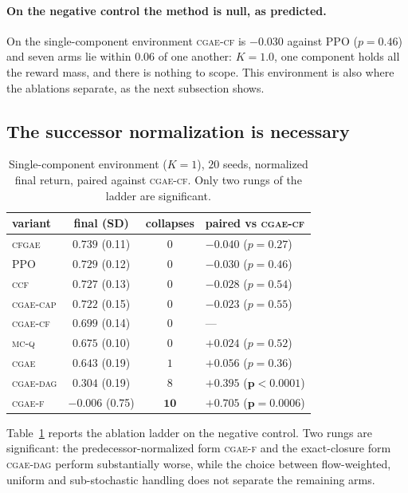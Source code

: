 \documentclass[review,authoryear,3p,times]{elsarticle}
\newcommand{\cgae}{\textsc{cgae}}              %
\newcommand{\cflow}{\textsc{cgae-cf}}          %
\newcommand{\cflowraw}{\textsc{cgae-f}}        %
\newcommand{\cdag}{\textsc{cgae-dag}}          %
\newcommand{\ccap}{\textsc{cgae-cap}}          %
\newcommand{\ccf}{\textsc{ccf}}
\newcommand{\mcq}{\textsc{mc-q}}
\newcommand{\cfgae}{\textsc{cfgae}}
\begin{document}
\paragraph{On the negative control the method is null, as predicted.} On the
single-component environment \cflow{} is $-0.030$ against PPO ($p=0.46$) and
seven arms lie within $0.06$ of one another: $K=1.0$, one component holds all
the reward mass, and there is nothing to scope. This environment is also where
the ablations separate, as the next subsection shows.

\subsection{The successor normalization is necessary}
\label{sec:normneeded}

\begin{table}[tbp]
\centering
\caption{Single-component environment ($K{=}1$), $20$ seeds, normalized final
return, paired against \cflow. Only two rungs of the ladder are significant.}
\label{tab:ablation}
\begin{tabular}{lccl}
\toprule
variant & final (SD) & collapses & paired vs \cflow \\
\midrule
\cfgae     & $0.739$ {\tiny(0.11)} & $0$ & $-0.040$ ($p=0.27$) \\
PPO        & $0.729$ {\tiny(0.12)} & $0$ & $-0.030$ ($p=0.46$) \\
\ccf       & $0.727$ {\tiny(0.13)} & $0$ & $-0.028$ ($p=0.54$) \\
\ccap      & $0.722$ {\tiny(0.15)} & $0$ & $-0.023$ ($p=0.55$) \\
\cflow     & $0.699$ {\tiny(0.14)} & $0$ & --- \\
\mcq       & $0.675$ {\tiny(0.10)} & $0$ & $+0.024$ ($p=0.52$) \\
\cgae      & $0.643$ {\tiny(0.19)} & $1$ & $+0.056$ ($p=0.36$) \\
\cdag      & $0.304$ {\tiny(0.19)} & $8$ & $\mathbf{+0.395}$ ($\mathbf{p<0.0001}$) \\
\cflowraw  & $-0.006$ {\tiny(0.75)} & $\mathbf{10}$ & $\mathbf{+0.705}$ ($\mathbf{p=0.0006}$) \\
\bottomrule
\end{tabular}
\end{table}

Table~\ref{tab:ablation} reports the ablation ladder on the negative control.
Two rungs are significant: the predecessor-normalized form \cflowraw{} and the
exact-closure form \cdag{} perform substantially worse, while the choice
between flow-weighted, uniform and sub-stochastic handling does not separate
the remaining arms.
\end{document}
